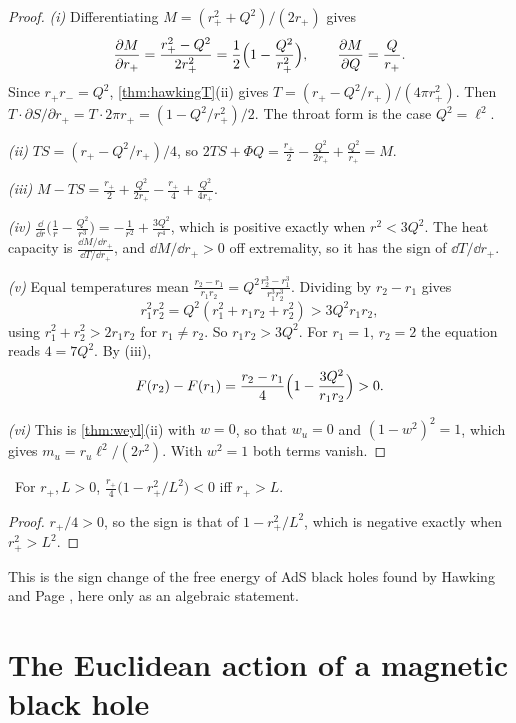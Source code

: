 \begin{proof}
\emph{(i)} Differentiating $M=(r_+^2+Q^2)/(2r_+)$ gives
\[
\frac{\partial M}{\partial r_+}=\frac{r_+^2-Q^2}{2r_+^2}=\frac12\Bigl(1-\frac{Q^2}{r_+^2}\Bigr),\qquad\frac{\partial M}{\partial Q}=\frac Q{r_+}.
\]
Since $r_+r_-=Q^2$, \cref{thm:hawkingT}(ii) gives $T=(r_+-Q^2/r_+)/(4\pi r_+^2)$. Then $T\cdot\partial S/\partial r_+=T\cdot2\pi r_+=(1-Q^2/r_+^2)/2$. The throat form is the case $Q^2=\ell^2$.

\emph{(ii)} $TS=(r_+-Q^2/r_+)/4$, so $2TS+\Phi Q=\frac{r_+}2-\frac{Q^2}{2r_+}+\frac{Q^2}{r_+}=M$.

\emph{(iii)} $M-TS=\frac{r_+}2+\frac{Q^2}{2r_+}-\frac{r_+}4+\frac{Q^2}{4r_+}$.

\emph{(iv)} $\frac{\dd}{\dd r}\bigl(\frac1r-\frac{Q^2}{r^3}\bigr)=-\frac1{r^2}+\frac{3Q^2}{r^4}$, which is positive exactly when $r^2<3Q^2$. The heat capacity is $\frac{\dd M/\dd r_+}{\dd T/\dd r_+}$, and $\dd M/\dd r_+>0$ off extremality, so it has the sign of $\dd T/\dd r_+$.

\emph{(v)} Equal temperatures mean $\frac{r_2-r_1}{r_1r_2}=Q^2\frac{r_2^3-r_1^3}{r_1^3r_2^3}$. Dividing by $r_2-r_1$ gives
\[
r_1^2r_2^2=Q^2(r_1^2+r_1r_2+r_2^2)>3Q^2r_1r_2 ,
\]
using $r_1^2+r_2^2>2r_1r_2$ for $r_1\ne r_2$. So $r_1r_2>3Q^2$. For $r_1=1$, $r_2=2$ the equation reads $4=7Q^2$. By (iii),
\[
F(r_2)-F(r_1)=\frac{r_2-r_1}4\Bigl(1-\frac{3Q^2}{r_1r_2}\Bigr)>0 .
\]

\emph{(vi)} This is \cref{thm:weyl}(ii) with $w=0$, so that $w_u=0$ and $(1-w^2)^2=1$, which gives $m_u=r_u\ell^2/(2r^2)$. With $w^2=1$ both terms vanish.
\end{proof}


\begin{proposition}\label{prop:hawkingpage}\ver\
For $r_+,L>0$, $\frac{r_+}4\bigl(1-r_+^2/L^2\bigr)<0$ iff $r_+>L$.
\end{proposition}
\begin{proof}
$r_+/4>0$, so the sign is that of $1-r_+^2/L^2$, which is negative exactly when $r_+^2>L^2$.
\end{proof}


This is the sign change of the free energy of AdS black holes found by Hawking and Page \cite{HawkingPage1983}, here only as an algebraic statement.

\section{The Euclidean action of a magnetic black hole}

